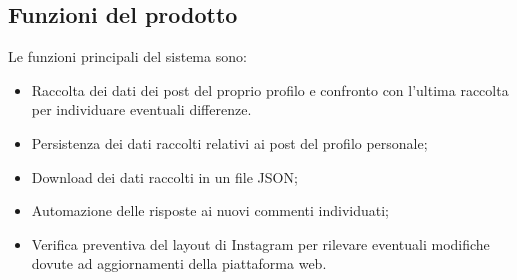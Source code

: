 
\subsection{Funzioni del prodotto}
Le funzioni principali del sistema sono:
\begin{itemize}
    \item Raccolta dei dati dei post del proprio profilo e confronto con l'ultima raccolta per individuare eventuali differenze.
    \item Persistenza dei dati raccolti relativi ai post del profilo personale;
    \item Download dei dati raccolti in un file JSON;
    \item Automazione delle risposte ai nuovi commenti individuati;
    \item Verifica preventiva del layout di Instagram per rilevare eventuali modifiche dovute ad aggiornamenti della piattaforma web.
\end{itemize}